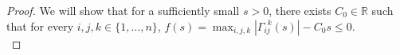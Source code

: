 \documentclass[pdflatex,sn-mathphys-num]{sn-jnl}
\theoremstyle{definition}
\begin{document}
\begin{proof}


    We will show that for a sufficiently small $s>0$, there exists $C_0 \in \mathbb{R}$ such that for every $i,j,k \in \{1,\dots,n\} $,  $f(s) = \max_{i,j,k}|\Gamma_{i j}^{~~k}(s)| - C_0s \leq 0$.\label{Gamma bound}\\


\end{proof}
\end{document}
